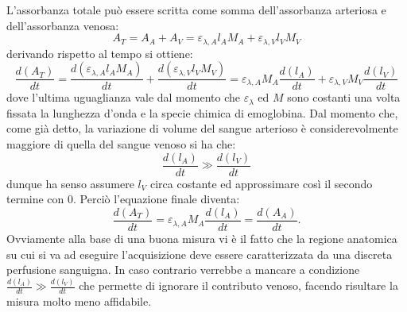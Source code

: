 \documentclass[12pt,a4paper, twoside, openright]{report}
\begin{document}
L'assorbanza totale può essere scritta come somma dell'assorbanza arteriosa e dell'assorbanza venosa: 
\begin{equation*}
	A_T = A_A + A_V = \varepsilon_{\lambda,A}l_AM_A + \varepsilon_{\lambda,V}l_VM_V
\end{equation*}
derivando rispetto al tempo si ottiene:
\begin{equation*}
    \frac{d(A_T)}{dt} = \frac{d(\varepsilon_{\lambda,A}l_AM_A)}{dt} + 							\frac{d(\varepsilon_{\lambda,V}l_VM_V)}{dt} = \varepsilon_{\lambda,A}M_A					\frac{d(l_A)}{dt} + \varepsilon_{\lambda,V}M_V\frac{d(l_V)}{dt}
\end{equation*}
dove l'ultima uguaglianza vale dal momento che $\varepsilon_{\lambda}$ ed $M$ sono costanti una volta fissata la lunghezza d'onda e la specie chimica di emoglobina. 
Dal momento che, come già detto, la variazione di volume del sangue arterioso è considerevolmente maggiore di quella del sangue venoso si ha che:
\begin{equation*}
    \frac{d(l_A)}{dt} \gg \frac{d(l_V)}{dt}
\end{equation*}
dunque ha senso assumere $l_V$ circa costante ed approssimare così il secondo termine con 0. 
Perciò l'equazione finale diventa:
\begin{equation*}
    \frac{d(A_T)}{dt} = \varepsilon_{\lambda,A}M_A\frac{d(l_A)}{dt} = \frac{d(A_A)}				{dt}.
\end{equation*}
Ovviamente alla base di una buona misura vi è il fatto che la regione anatomica su cui si va ad eseguire l'acquisizione deve essere caratterizzata da una discreta perfusione sanguigna. 
In caso contrario verrebbe a mancare a condizione $\frac{d(l_A)}{dt} \gg \frac{d(l_V)}{dt}$ che permette di ignorare il contributo venoso, facendo risultare la misura molto meno affidabile.
\end{document}
